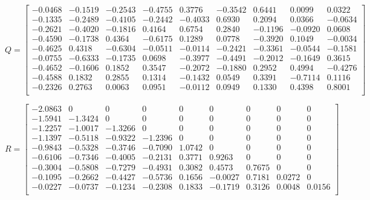 \documentclass{article}
\begin{document}
$Q = \begin{bmatrix}
    -0.0468 & -0.1519 & -0.2543 & -0.4755 &  0.3776 & -0.3542 &  0.6441 &  0.0099 &  0.0322 \\ 
    -0.1335 & -0.2489 & -0.4105 & -0.2442 & -0.4033 &  0.6930 &  0.2094 &  0.0366 & -0.0634 \\ 
    -0.2621 & -0.4020 & -0.1816 &  0.4164 &  0.6754 &  0.2840 & -0.1196 & -0.0920 &  0.0608 \\ 
    -0.4590 & -0.1738 &  0.4364 & -0.6175 &  0.1289 &  0.0778 & -0.3920 &  0.1049 & -0.0034 \\ 
    -0.4625 &  0.4318 & -0.6304 & -0.0511 & -0.0114 & -0.2421 & -0.3361 & -0.0544 & -0.1581 \\ 
    -0.0755 & -0.6333 & -0.1735 &  0.0698 & -0.3977 & -0.4491 & -0.2012 & -0.1649 &  0.3615 \\ 
    -0.4652 & -0.1606 &  0.1852 &  0.3547 & -0.2072 & -0.1880 &  0.2952 &  0.4994 & -0.4276 \\ 
    -0.4588 &  0.1832 &  0.2855 &  0.1314 & -0.1432 &  0.0549 &  0.3391 & -0.7114 &  0.1116 \\ 
    -0.2326 &  0.2763 &  0.0063 &  0.0951 & -0.0112 &  0.0949 &  0.1330 &  0.4398 &  0.8001 \\
    \end{bmatrix}$
    
$R = \begin{bmatrix}
    -2.0863 &       0 &       0 &       0 &       0 &       0 &       0 &       0 &       0 \\ 
    -1.5941 & -1.3424 &       0 &       0 &       0 &       0 &       0 &       0 &       0 \\ 
    -1.2257 & -1.0017 & -1.3266 &       0 &       0 &       0 &       0 &       0 &       0 \\ 
    -1.1397 & -0.5118 & -0.9322 & -1.2396 &       0 &       0 &       0 &       0 &       0 \\ 
    -0.9843 & -0.5328 & -0.3746 & -0.7090 &  1.0742 &       0 &       0 &       0 &       0 \\ 
    -0.6106 & -0.7346 & -0.4005 & -0.2131 &  0.3771 &  0.9263 &       0 &       0 &       0 \\ 
    -0.3004 & -0.5808 & -0.7279 & -0.4931 &  0.3082 &  0.4573 &  0.7675 &       0 &       0 \\ 
    -0.1095 & -0.2662 & -0.4427 & -0.5736 &  0.1656 & -0.0027 &  0.7181 &  0.0272 &       0 \\ 
    -0.0227 & -0.0737 & -0.1234 & -0.2308 &  0.1833 & -0.1719 &  0.3126 &  0.0048 &  0.0156 \\ 
    \end{bmatrix}$
    
\end{document}
